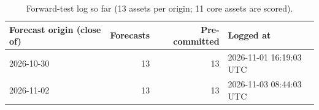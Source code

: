 \begin{table}[!htbp]
\centering
\small
\caption{Forward-test log so far (13 assets per origin; 11 core assets are scored).}
\label{tab:fwdlog}
\begin{tabularx}{\linewidth}{lrrX}
\toprule
\textbf{Forecast origin (close of)} & \textbf{Forecasts} & \textbf{Pre-committed} & \textbf{Logged at} \\
\midrule
2026-10-30 & 13 & 13 & 2026-11-01 16:19:03 UTC \\
2026-11-02 & 13 & 13 & 2026-11-03 08:44:03 UTC \\
\bottomrule
\end{tabularx}
\end{table}
